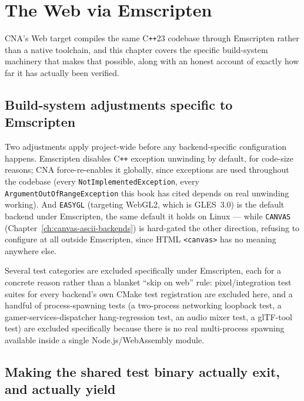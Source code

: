 \chapter{The Web via Emscripten}
\label{ch:web-emscripten}

CNA's Web target compiles the same C\texttt{++}23 codebase through Emscripten rather than a
native toolchain, and this chapter covers the specific build-system machinery that makes that
possible, along with an honest account of exactly how far it has actually been verified.

\section{Build-system adjustments specific to Emscripten}

Two adjustments apply project-wide before any backend-specific configuration happens.
Emscripten disables C\texttt{++} exception unwinding by default, for code-size reasons; CNA
force-re-enables it globally, since exceptions are used throughout the codebase (every
\texttt{NotImplementedException}, every \texttt{ArgumentOutOfRangeException} this book has
cited depends on real unwinding working). And \texttt{EASYGL} (targeting WebGL2, which is
GLES~3.0) is the default backend under Emscripten, the same default it holds on Linux ---
while \texttt{CANVAS} (Chapter~\ref{ch:canvas-ascii-backends}) is hard-gated the other
direction, refusing to configure at all outside Emscripten, since HTML \texttt{<canvas>} has
no meaning anywhere else.

Several test categories are excluded specifically under Emscripten, each for a concrete
reason rather than a blanket ``skip on web'' rule: pixel/integration test suites for every
backend's own CMake test registration are excluded here, and a handful of process-spawning
tests (a two-process networking loopback test, a gamer-services-dispatcher hang-regression
test, an audio mixer test, a glTF-tool test) are excluded specifically because there is no
real multi-process spawning available inside a single Node.js/WebAssembly module.

\section{Making the shared test binary actually exit, and actually yield}

